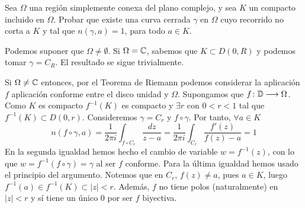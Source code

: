 \documentclass[twoside]{article}
\begin{document}
\begin{ejercicio}{11}
Sea $\Omega$ una región simplemente conexa del plano complejo, y sea $K$ un compacto incluido en $\Omega$. Probar que existe una curva cerrada $\gamma$ en $\Omega$ cuyo recorrido no corta a $K$ y tal que $n(\gamma,a)=1$, para todo $a\in K$.
\end{ejercicio}
\begin{solucion}
Podemos suponer que $\Omega\neq \emptyset$. Si $\Omega = \mathbb{C}$, sabemos que $K\subset D(0,R)$ y podemos tomar $\gamma = C_R$. El resultado se sigue trivialmente.

Si $\Omega \neq \mathbb{C}$ entonces, por el Teorema de Riemann podemos considerar la aplicación $f$ aplicación conforme entre el disco unidad y $\Omega$. Supongamos que $f\colon{\mathbb{D}}\longrightarrow{\Omega}$. Como $K$ es compacto $f^{-1}(K)$ es compacto y $\exists r$ con $0<r<1$ tal que $f^{-1}(K)\subset D(0,r)$. Consideremos $\gamma = C_r$ y $f \circ \gamma$. Por tanto, $\forall a \in K$
$$
n(f\circ \gamma,a)=\frac{1}{2\pi i} \int_{f \circ C_r} \frac{dz}{z-a} = \frac{1}{2\pi i}\int_{C_r} \frac{f'(z)}{f(z)-a} =  1
$$
En la segunda igualdad hemos hecho el cambio de variable $w = f^{-1}(z)$, con lo que $w= f^{-1}(f\circ \gamma) = \gamma$ al ser $f$ conforme. Para la última igualdad hemos usado el principio del argumento. Notemos que en $C_r$, $f(z) \neq a$, pues $a \in K$, luego $f^{-1}(a) \in f^{-1}(K) \subset |z|<r$. Además, $f$ no tiene polos (naturalmente) en $|z|<r$ y sí tiene un único $0$ por ser $f$ biyectiva.
\end{solucion}
\newpage
\end{document}
